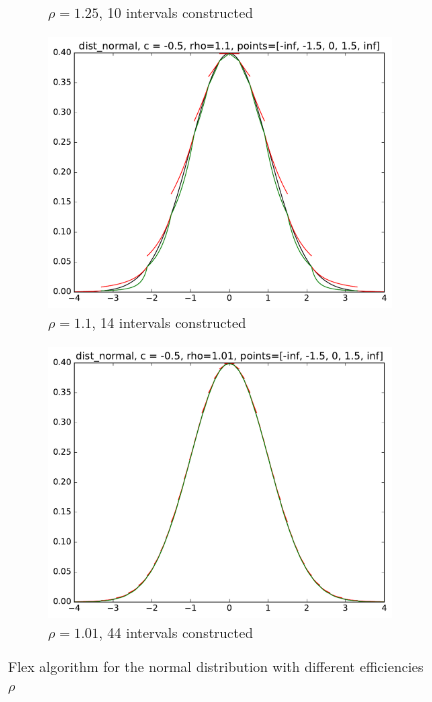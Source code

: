 \documentclass[]{article}
\begin{document}
\begin{figure}
\begin{subfigure}[b]{0.49\textwidth}
        \caption{$\rho = 1.25$, 10 intervals constructed}
    \end{subfigure}
    \centering
    \begin{subfigure}[b]{0.49\textwidth}
        \includegraphics[width=\textwidth]{figs/tf_example_normal_14.pdf}
        \caption{$\rho = 1.1$, 14 intervals constructed}
    \end{subfigure}
    \begin{subfigure}[b]{0.49\textwidth}
        \includegraphics[width=\textwidth]{figs/tf_example_normal_44.pdf}
        \caption{$\rho = 1.01$, 44 intervals constructed}
    \end{subfigure}
    \caption{Flex algorithm for the normal distribution with different efficiencies $\rho$}
     \label{fig:tf_example_normal}
\end{figure}
\end{document}
